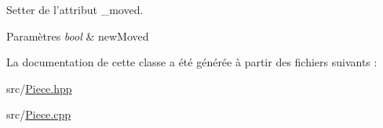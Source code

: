 Setter de l'attribut \-\_\-moved. 


\begin{DoxyParams}{Paramètres}
{\em bool} & new\-Moved \\
\hline
\end{DoxyParams}


La documentation de cette classe a été générée à partir des fichiers suivants \-:\begin{DoxyCompactItemize}
\item 
src/\hyperlink{_piece_8hpp}{Piece.\-hpp}\item 
src/\hyperlink{_piece_8cpp}{Piece.\-cpp}\end{DoxyCompactItemize}
